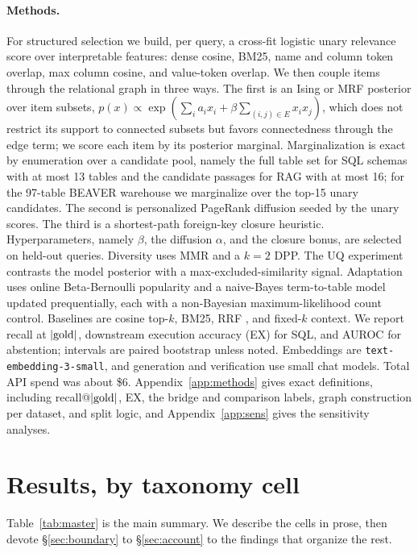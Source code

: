 \documentclass[11pt]{article}
\begin{document}
\paragraph{Methods.} For structured selection we build, per query, a cross-fit logistic unary relevance
score over interpretable features: dense cosine, BM25, name and column token overlap, max column
cosine, and value-token overlap. We then couple items through the relational graph in three ways. The
first is an Ising or MRF posterior over item subsets,
$p(x)\propto\exp(\sum_i a_i x_i + \beta\sum_{(i,j)\in E} x_i x_j)$, which does not restrict its support
to connected subsets but favors connectedness through the edge term; we score each item by its
posterior marginal. Marginalization is exact by enumeration over a candidate pool, namely the full
table set for SQL schemas with at most 13 tables and the candidate passages for RAG with at most 16; for
the 97-table BEAVER warehouse we marginalize over the top-15 unary candidates. The second is
personalized PageRank diffusion \citep{page1999pagerank} seeded by the unary scores. The third is a
shortest-path foreign-key closure heuristic. Hyperparameters, namely $\beta$, the diffusion $\alpha$,
and the closure bonus, are selected on held-out queries. Diversity uses MMR \citep{carbonell1998mmr}
and a $k\!=\!2$ DPP. The UQ experiment contrasts the model posterior with a max-excluded-similarity
signal. Adaptation uses online Beta-Bernoulli popularity and a naive-Bayes term-to-table model updated
prequentially, each with a non-Bayesian maximum-likelihood count control. Baselines are cosine top-$k$,
BM25, RRF \citep{cormack2009rrf}, and fixed-$k$ context. We report recall at $|{\rm gold}|$, downstream
execution accuracy (EX) for SQL, and AUROC for abstention; intervals are paired bootstrap unless noted.
Embeddings are \texttt{text-embedding-3-small}, and generation and verification use small chat models.
Total API spend was about \$6. Appendix~\ref{app:methods} gives exact definitions, including
recall@$|{\rm gold}|$, EX, the bridge and comparison labels, graph construction per dataset, and split
logic, and Appendix~\ref{app:sens} gives the sensitivity analyses.

\section{Results, by taxonomy cell}\label{sec:results}

Table~\ref{tab:master} is the main summary. We describe the cells in prose, then devote
\S\ref{sec:boundary} to \S\ref{sec:account} to the findings that organize the rest.
\end{document}
